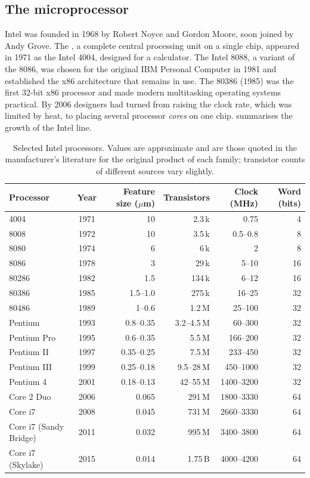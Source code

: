 \subsection{The microprocessor}
Intel was founded in 1968 by Robert Noyce and Gordon Moore, soon joined by Andy Grove. The , a complete central processing unit on a single chip, appeared in 1971 as the Intel 4004, designed for a calculator. The Intel 8088, a variant of the 8086, was chosen for the original IBM Personal Computer in 1981 and established the x86 architecture that remains in use. The 80386 (1985) was the first 32-bit x86 processor and made modern multitasking operating systems practical. By 2006 designers had turned from raising the clock rate, which was limited by heat, to placing several processor \emph{cores} on one chip.  summarises the growth of the Intel line.

\begin{table}[htbp]
\centering
\small
\caption{Selected Intel processors. Values are approximate and are those quoted in the manufacturer's literature for the original product of each family; transistor counts of different sources vary slightly.}
\label{tab:intel}
\begin{tabular}{@{}lcrrrr@{}}
\toprule
Processor & Year & Feature size ($\mu$m) & Transistors & Clock (MHz) & Word (bits)\\
\midrule
4004        & 1971 & 10        & 2.3\,k  & 0.75         & 4\\
8008        & 1972 & 10        & 3.5\,k  & 0.5--0.8     & 8\\
8080        & 1974 & 6         & 6\,k    & 2            & 8\\
8086        & 1978 & 3         & 29\,k   & 5--10        & 16\\
80286       & 1982 & 1.5       & 134\,k  & 6--12        & 16\\
80386       & 1985 & 1.5--1.0  & 275\,k  & 16--25       & 32\\
80486       & 1989 & 1--0.6    & 1.2\,M  & 25--100      & 32\\
Pentium     & 1993 & 0.8--0.35 & 3.2--4.5\,M & 60--300  & 32\\
Pentium Pro & 1995 & 0.6--0.35 & 5.5\,M  & 166--200     & 32\\
Pentium II  & 1997 & 0.35--0.25& 7.5\,M  & 233--450     & 32\\
Pentium III & 1999 & 0.25--0.18& 9.5--28\,M & 450--1000 & 32\\
Pentium 4   & 2001 & 0.18--0.13& 42--55\,M  & 1400--3200& 32\\
Core 2 Duo  & 2006 & 0.065     & 291\,M  & 1800--3330   & 64\\
Core i7     & 2008 & 0.045     & 731\,M  & 2660--3330   & 64\\
Core i7 (Sandy Bridge) & 2011 & 0.032 & 995\,M & 3400--3800 & 64\\
Core i7 (Skylake)      & 2015 & 0.014 & 1.75\,B & 4000--4200 & 64\\
\bottomrule
\end{tabular}
\end{table}

